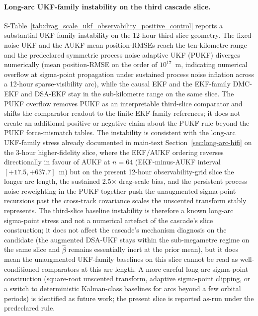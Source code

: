 \documentclass{article}
\begin{document}
\paragraph{Long-arc UKF-family instability on the third cascade slice.}
S-Table~\ref{tab:drag_scale_ukf_observability_positive_control} reports a substantial UKF-family instability on the 12-hour third-slice geometry. The fixed-noise UKF and the AUKF mean position-RMSEs reach the ten-kilometre range and the predeclared symmetric process noise adaptive UKF (PUKF) diverges numerically (mean position-RMSE on the order of $10^{17}$~m, indicating numerical overflow at sigma-point propagation under sustained process noise inflation across a 12-hour sparse-visibility arc), while the causal EKF and the EKF-family DMC-EKF and DSA-EKF stay in the sub-kilometre range on the same slice. The PUKF overflow removes PUKF as an interpretable third-slice comparator and shifts the comparator readout to the finite EKF-family references; it does not create an additional positive or negative claim about the PUKF rule beyond the PUKF force-mismatch tables. The instability is consistent with the long-arc UKF-family stress already documented in main-text Section~\ref{sec:long-arc-hifi} on the 3-hour higher-fidelity slice, where the EKF$/$AUKF ordering reverses directionally in favour of AUKF at $n=64$ (EKF-minus-AUKF interval $[+17.5,+637.7]$~m) but on the present 12-hour observability-grid slice the longer arc length, the sustained 2.5$\times$ drag-scale bias, and the persistent process noise reweighting in the PUKF together push the unaugmented sigma-point recursions past the cross-track covariance scales the unscented transform stably represents. The third-slice baseline instability is therefore a known long-arc sigma-point stress and not a numerical artefact of the cascade's slice construction; it does not affect the cascade's mechanism diagnosis on the candidate (the augmented DSA-UKF stays within the sub-megametre regime on the same slice and $\hat{\beta}$ remains essentially inert at the prior mean), but it does mean the unaugmented UKF-family baselines on this slice cannot be read as well-conditioned comparators at this arc length. A more careful long-arc sigma-point construction (square-root unscented transform, adaptive sigma-point clipping, or a switch to deterministic Kalman-class baselines for arcs beyond a few orbital periods) is identified as future work; the present slice is reported as-run under the predeclared rule.
\end{document}
